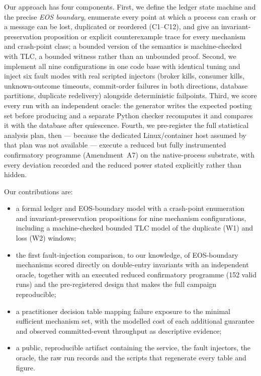 Our approach has four components. First, we define the ledger state machine and the precise
\emph{EOS boundary}, enumerate every point at which a process can crash or a message can be lost,
duplicated or reordered (C1--C12), and give an invariant-preservation proposition or explicit
counterexample trace for every mechanism and crash-point class; a bounded version of the
semantics is machine-checked with TLC, a bounded witness rather than an unbounded proof. Second,
we implement all nine configurations in one code base with identical tuning and inject six fault
modes with real scripted injectors (broker kills, consumer kills, unknown-outcome timeouts,
commit-order failures in both directions, database partitions, duplicate redelivery) alongside
deterministic failpoints. Third, we score every run with an independent oracle: the generator
writes the expected posting set before producing and a separate Python checker recomputes it and
compares it with the database after quiescence. Fourth, we pre-register the full statistical
analysis plan, then --- because the dedicated Linux/container host assumed by that plan was not
available --- execute a reduced but fully instrumented confirmatory programme (Amendment~A7) on the
native-process substrate, with every deviation recorded and the reduced power stated explicitly
rather than hidden.

Our contributions are:
\begin{itemize}[leftmargin=1.1em,itemsep=1pt]
\item a formal ledger and EOS-boundary model with a crash-point enumeration and
      invariant-preservation propositions for nine mechanism configurations, including a
      machine-checked bounded TLC model of the duplicate (W1) and loss (W2) windows;
\item the first fault-injection comparison, to our knowledge, of EOS-boundary mechanisms scored
      directly on double-entry invariants with an independent oracle, together with an executed
      reduced confirmatory programme (152 valid runs) and the pre-registered design that makes the
      full campaign reproducible;
\item a practitioner decision table mapping failure exposure to the minimal sufficient mechanism
      set, with the modelled cost of each additional guarantee and observed committed-event
      throughput as descriptive evidence;
\item a public, reproducible artifact containing the service, the fault injectors, the oracle,
      the raw run records and the scripts that regenerate every table and figure.
\end{itemize}

